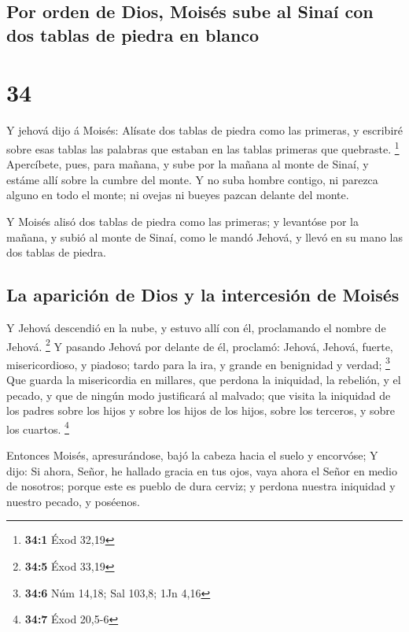 \hypertarget{por-orden-de-dios-moisuxe9s-sube-al-sinauxed-con-dos-tablas-de-piedra-en-blanco}{%
\subsection{Por orden de Dios, Moisés sube al Sinaí con dos tablas de
piedra en
blanco}\label{por-orden-de-dios-moisuxe9s-sube-al-sinauxed-con-dos-tablas-de-piedra-en-blanco}}

\hypertarget{section-33}{%
\section{34}\label{section-33}}

 Y jehová dijo á Moisés: Alísate dos tablas de piedra como
las primeras, y escribiré sobre esas tablas las palabras que estaban en
las tablas primeras que quebraste. \footnote{\textbf{34:1} Éxod 32,19}
 Apercíbete, pues, para mañana, y sube por la mañana al
monte de Sinaí, y estáme allí sobre la cumbre del monte.  Y
no suba hombre contigo, ni parezca alguno en todo el monte; ni ovejas ni
bueyes pazcan delante del monte.

 Y Moisés alisó dos tablas de piedra como las primeras; y
levantóse por la mañana, y subió al monte de Sinaí, como le mandó
Jehová, y llevó en su mano las dos tablas de piedra.

\hypertarget{la-apariciuxf3n-de-dios-y-la-intercesiuxf3n-de-moisuxe9s}{%
\subsection{La aparición de Dios y la intercesión de
Moisés}\label{la-apariciuxf3n-de-dios-y-la-intercesiuxf3n-de-moisuxe9s}}

 Y Jehová descendió en la nube, y estuvo allí con él,
proclamando el nombre de Jehová. \footnote{\textbf{34:5} Éxod 33,19}
 Y pasando Jehová por delante de él, proclamó: Jehová,
Jehová, fuerte, misericordioso, y piadoso; tardo para la ira, y grande
en benignidad y verdad; \footnote{\textbf{34:6} Núm 14,18; Sal 103,8;
  1Jn 4,16}  Que guarda la misericordia en millares, que
perdona la iniquidad, la rebelión, y el pecado, y que de ningún modo
justificará al malvado; que visita la iniquidad de los padres sobre los
hijos y sobre los hijos de los hijos, sobre los terceros, y sobre los
cuartos. \footnote{\textbf{34:7} Éxod 20,5-6}

 Entonces Moisés, apresurándose, bajó la cabeza hacia el
suelo y encorvóse;  Y dijo: Si ahora, Señor, he hallado
gracia en tus ojos, vaya ahora el Señor en medio de nosotros; porque
este es pueblo de dura cerviz; y perdona nuestra iniquidad y nuestro
pecado, y poséenos.

